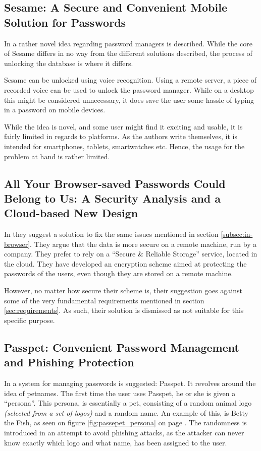 		\subsection*{Sesame: A Secure and Convenient Mobile Solution for Passwords}
			In \cite{sesame} a rather novel idea regarding password managers is described. While the core of Sesame differs in no way from the different solutions described, the process of unlocking the database is where it differs.

			Sesame can be unlocked using voice recognition. Using a remote server, a piece of recorded voice can be used to unlock the password manager. While on a desktop this might be considered unnecessary, it does save the user some hassle of typing in a password on mobile devices.

			While the idea is novel, and some user might find it exciting and usable, it is fairly limited in regards to platforms. As the authors write themselves, it is intended for smartphones, tablets, smartwatches etc. Hence, the usage for the problem at hand is rather limited.

		\subsection*{All Your Browser-saved Passwords Could Belong to Us: A Security Analysis and a Cloud-based New Design}
			In \cite{browser_saved} they suggest a solution to fix the same issues mentioned in section \ref{subsec:in-browser}. They argue that the data is more secure on a remote machine, run by a company. They prefer to rely on a ``Secure \& Reliable Storage'' service, located in the cloud. They have developed an encryption scheme aimed at protecting the passwords of the users, even though they are stored on a remote machine. 

			However, no matter how secure their scheme is, their suggestion goes against some of the very fundamental requirements mentioned in section \ref{sec:requirements}. As such, their solution is dismissed as not suitable for this specific purpose. 

		\subsection*{Passpet: Convenient Password Management and Phishing Protection}
			In \cite{passpet} a system for managing passwords is suggested: Passpet. It revolves around the idea of petnames. The first time the user uses Passpet, he or she is given a ``persona''. This persona, is essentially a pet, consisting of a random animal logo \emph{(selected from a set of logos)} and a random name. An example of this, is Betty the Fish, as seen on figure \ref{fig:passepet_persona} on page \pageref{fig:passepet_persona}. The randomness is introduced in an attempt to avoid phishing attacks, as the attacker can never know exactly which logo and what name, has been assigned to the user.

